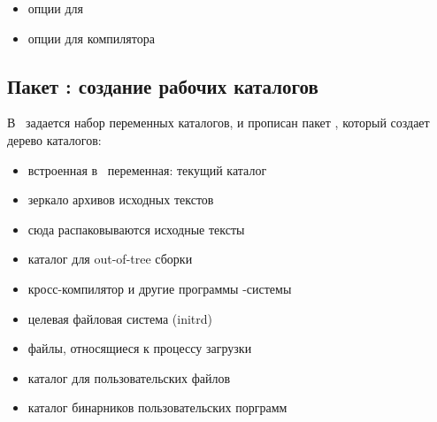 {\begin{itemize}
  \item{} опции для 
  \item{} опции для компилятора 
\end{itemize}


\subsection{Пакет : создание рабочих каталогов}



В \ задается набор переменных каталогов, и прописан пакет
, который создает дерево каталогов:

\begin{itemize}
  \item{} встроенная в \make\ переменная: текущий каталог
  \item{} зеркало архивов исходных текстов
  \item{} сюда распаковываются исходные тексты
  \item{} каталог для out-of-tree сборки
  \item{} кросс-компилятор и другие программы -системы
  \item{} целевая файловая система  (initrd)
  \item{} файлы, относящиеся к процессу загрузки
  \item{} каталог для пользовательских файлов
  \item{} каталог бинарников пользовательских порграмм
\end{itemize}


}
